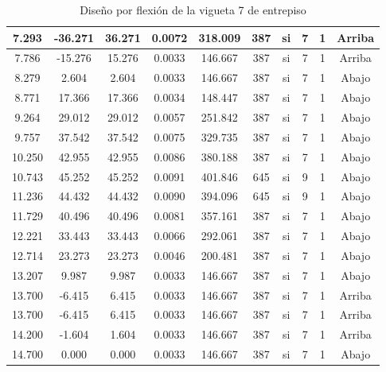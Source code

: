 \begin{table}[H]
{\begin{tabular}{|c|c|c|c|c|c|c|c|c|c|}
    \hline
    7.293 & -36.271 & 36.271 & 0.0072 & 318.009 & 387 & si  & 7   & 1   & Arriba \bigstrut\\
    \hline
    7.786 & -15.276 & 15.276 & 0.0033 & 146.667 & 387 & si  & 7   & 1   & Arriba \bigstrut\\
    \hline
    8.279 & 2.604 & 2.604 & 0.0033 & 146.667 & 387 & si  & 7   & 1   & Abajo \bigstrut\\
    \hline
    8.771 & 17.366 & 17.366 & 0.0034 & 148.447 & 387 & si  & 7   & 1   & Abajo \bigstrut\\
    \hline
    9.264 & 29.012 & 29.012 & 0.0057 & 251.842 & 387 & si  & 7   & 1   & Abajo \bigstrut\\
    \hline
    9.757 & 37.542 & 37.542 & 0.0075 & 329.735 & 387 & si  & 7   & 1   & Abajo \bigstrut\\
    \hline
    10.250 & 42.955 & 42.955 & 0.0086 & 380.188 & 387 & si  & 7   & 1   & Abajo \bigstrut\\
    \hline
    10.743 & 45.252 & 45.252 & 0.0091 & 401.846 & 645 & si  & 9   & 1   & Abajo \bigstrut\\
    \hline
    11.236 & 44.432 & 44.432 & 0.0090 & 394.096 & 645 & si  & 9   & 1   & Abajo \bigstrut\\
    \hline
    11.729 & 40.496 & 40.496 & 0.0081 & 357.161 & 387 & si  & 7   & 1   & Abajo \bigstrut\\
    \hline
    12.221 & 33.443 & 33.443 & 0.0066 & 292.061 & 387 & si  & 7   & 1   & Abajo \bigstrut\\
    \hline
    12.714 & 23.273 & 23.273 & 0.0046 & 200.481 & 387 & si  & 7   & 1   & Abajo \bigstrut\\
    \hline
    13.207 & 9.987 & 9.987 & 0.0033 & 146.667 & 387 & si  & 7   & 1   & Abajo \bigstrut\\
    \hline
    13.700 & -6.415 & 6.415 & 0.0033 & 146.667 & 387 & si  & 7   & 1   & Arriba \bigstrut\\
    \hline
    13.700 & -6.415 & 6.415 & 0.0033 & 146.667 & 387 & si  & 7   & 1   & Arriba \bigstrut\\
    \hline
    14.200 & -1.604 & 1.604 & 0.0033 & 146.667 & 387 & si  & 7   & 1   & Arriba \bigstrut\\
    \hline
    14.700 & 0.000 & 0.000 & 0.0033 & 146.667 & 387 & si  & 7   & 1   & Abajo \bigstrut\\
    \hline
    \end{tabular}%
   
}%
      \caption{Diseño por flexión de la vigueta 7 de entrepiso}
  \label{tab:F VT7 EP}%
\end{table}%